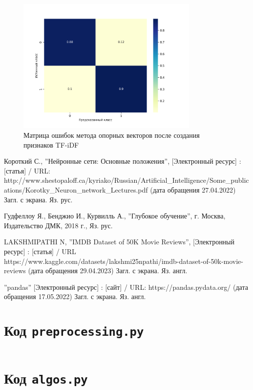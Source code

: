 \documentclass[bachelor, och, coursework]{SCWorks}
\begin{document}
        \begin{figure}[H]
            \centering
            \includegraphics[width=0.8\textwidth]{pic/TFIDF-SVM.png}
            \caption{Матрица ошибок метода опорных векторов после создания признаков TF-iDF}
        \end{figure}

\conclusion

\begin{thebibliography}{99}
     Короткий С., ''Нейронные сети: Основные положения'',
    [Электронный ресурс] : [статья] / URL:
    http://www.shestopaloff.ca/kyriako/Russian/Artificial_Intelligence/Some_publications/Korotky_Neuron_network_Lectures.pdf
    (дата обращения 27.04.2022) Загл. с экрана. Яз. рус.
    
     Гудфеллоу Я., Бенджио И., Курвилль А., ''Глубокое обучение'',
    г. Москва, Издательство ДМК, 2018 г., Яз. рус.
    
     LAKSHMIPATHI N, ''IMDB Dataset of 50K Movie Reviews'',
    [Электронный ресурс] : [статья] / URL
    https://www.kaggle.com/datasets/lakshmi25npathi/imdb-dataset-of-50k-movie-reviews
    (дата обращения 29.04.2023) Загл. с экрана. Яз. англ.






     ''pandas'' [Электронный ресурс] : [сайт] / URL:
    https://pandas.pydata.org/ (дата обращения 17.05.2022) Загл. с экрана. Яз.
    англ.

\end{thebibliography}

\appendix

    \section{Код \texttt{preprocessing.py}}
    \inputminted{py}{../movie-review-data/preprocessing.py}

    \section{Код \texttt{algos.py}}
    \inputminted{py}{../movie-review-data/algos.py}
\end{document}
